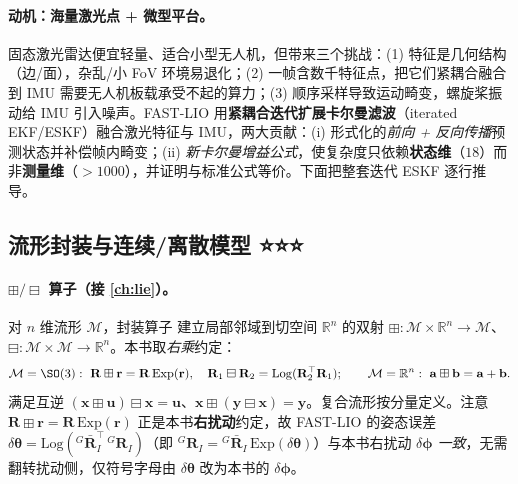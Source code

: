 \paragraph{动机：海量激光点 + 微型平台。}
固态激光雷达便宜轻量、适合小型无人机，但带来三个挑战\cite{xu2021fastlio}：(1) 特征是几何结构（边/面），杂乱/小 FoV 环境易退化；(2) 一帧含数千特征点，把它们紧耦合融合到 IMU 需要无人机板载承受不起的算力；(3) 顺序采样导致运动畸变，螺旋桨振动给 IMU 引入噪声。FAST-LIO 用\textbf{紧耦合迭代扩展卡尔曼滤波}（iterated EKF/ESKF）融合激光特征与 IMU，两大贡献：(i) 形式化的\emph{前向 + 反向传播}预测状态并补偿帧内畸变；(ii) \emph{新卡尔曼增益公式}，使复杂度只依赖\textbf{状态维}（$18$）而非\textbf{测量维}（$>1000$），并证明与标准公式等价。下面把整套迭代 ESKF 逐行推导。

\subsection{流形封装与连续/离散模型 ⭐⭐⭐}
\label{sec:lidar-fl-model}

\paragraph{$\boxplus/\boxminus$ 算子（接 \cref{ch:lie}）。}
对 $n$ 维流形 $\mathcal{M}$，封装算子\cite{hertzberg2013integrating} 建立局部邻域到切空间 $\mathbb{R}^n$ 的双射 $\boxplus:\mathcal{M}\times\mathbb{R}^n\to\mathcal{M}$、$\boxminus:\mathcal{M}\times\mathcal{M}\to\mathbb{R}^n$。本书取\emph{右乘}约定：
\begin{equation}
  \mathcal{M}=\SO(3):\ \mathbf{R}\boxplus\mathbf{r}=\mathbf{R}\,\mathrm{Exp}(\mathbf{r}),\quad \mathbf{R}_1\boxminus\mathbf{R}_2=\mathrm{Log}(\mathbf{R}_2^\top\mathbf{R}_1);\qquad \mathcal{M}=\mathbb{R}^n:\ \mathbf{a}\boxplus\mathbf{b}=\mathbf{a}+\mathbf{b}.
  \label{eq:lidar-fl-boxplus}
\end{equation}
满足互逆 $(\mathbf{x}\boxplus\mathbf{u})\boxminus\mathbf{x}=\mathbf{u}$、$\mathbf{x}\boxplus(\mathbf{y}\boxminus\mathbf{x})=\mathbf{y}$。复合流形按分量定义。注意 $\mathbf{R}\boxplus\mathbf{r}=\mathbf{R}\,\mathrm{Exp}(\mathbf{r})$ 正是本书\textbf{右扰动}约定，故 FAST-LIO 的姿态误差 $\delta\boldsymbol{\theta}=\mathrm{Log}({}^G\bar{\mathbf{R}}_I^\top\,{}^G\mathbf{R}_I)$（即 ${}^G\mathbf{R}_I={}^G\bar{\mathbf{R}}_I\,\mathrm{Exp}(\delta\boldsymbol{\theta})$）与本书右扰动 $\delta\boldsymbol{\phi}$ \emph{一致}，无需翻转扰动侧，仅符号字母由 $\delta\boldsymbol{\theta}$ 改为本书的 $\delta\boldsymbol{\phi}$。

